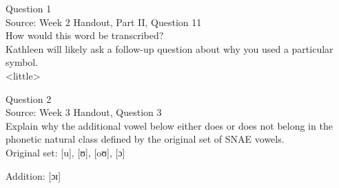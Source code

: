 \documentclass[12pt]{article}
\begin{document}
\begin{center}
\textbf{{\color{violet}{\HUGE 20201002 Friday\\}}}

\textbf{{\color{violet}{\HUGE ALL EXAMS\\}}}

\end{center}
\newpage

\begin{center}
\textbf{{\color{blue}{\HUGE START OF EXAM\\}}}

\textbf{{\color{blue}{\HUGE Student ID: 34785\\}}}

\textbf{{\color{blue}{\HUGE 4:00\\}}}

\end{center}
\newpage

{\large Question 1}\\

Source: Week 2 Handout, Part II, Question 11\\

How would this word be transcribed?\\ Kathleen will likely ask a follow-up question about why you used a particular symbol.\\

<little>


\newpage

{\large Question 2}\\

Source: Week 3 Handout, Question 3\\

Explain why the additional vowel below either does or does not belong in the phonetic natural class defined by the original set of SNAE vowels.\\

Original set: {[u]}, {[ʊ]}, {[oʊ]}, {[ɔ]}

Addition: {[ɔɪ]}


\newpage

\begin{center}
\textbf{{\color{red}{\HUGE END OF EXAM}}}\\

\end{center}
\newpage

\begin{center}
\textbf{{\color{blue}{\HUGE START OF EXAM\\}}}

\textbf{{\color{blue}{\HUGE Student ID: 90811\\}}}

\textbf{{\color{blue}{\HUGE 4:10\\}}}

\end{center}
\newpage
\end{document}
